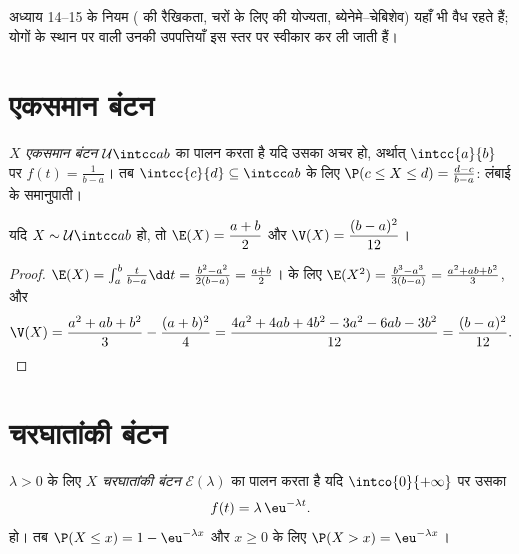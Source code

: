 अध्याय 14--15 के नियम ( की रैखिकता,  चरों के लिए  की
योज्यता, ब्येनेमे--चेबिशेव) यहाँ भी वैध रहते हैं; योगों के स्थान पर 
वाली उनकी उपपत्तियाँ इस स्तर पर स्वीकार कर ली जाती हैं।

\section{एकसमान बंटन}

\begin{definition}[एकसमान बंटन]\label{def:g12:contdist:uniform}
$X$ \emph{एकसमान बंटन} $\mathcal U\intcc ab$ का पालन करता है यदि उसका
 अचर हो, अर्थात् $\intcc{a}{b}$ पर $f(t) = \frac{1}{b-a}$। तब $\intcc{c}{d} \subseteq \intcc ab$ के लिए $\P(c \leq X \leq d) = \frac{d - c}{b - a}$:  लंबाई के
समानुपाती।
\end{definition}

\begin{proposition}\label{prop:g12:contdist:uniformmoments}
यदि $X \sim \mathcal U\intcc ab$ हो, तो $\E(X) = \dfrac{a+b}{2}$ और $\V(X) = \dfrac{(b-a)^2}{12}$।
\end{proposition}

\begin{proof}
$\E(X) = \int_a^b \frac{t}{b-a}\dd t
= \frac{b^2 - a^2}{2(b-a)} = \frac{a+b}{2}$।  के लिए $\E(X^2) = \frac{b^3 - a^3}{3(b-a)} = \frac{a^2 + ab + b^2}{3}$, और
\[
\V(X) = \frac{a^2 + ab + b^2}{3} - \frac{(a+b)^2}{4}
= \frac{4a^2 + 4ab + 4b^2 - 3a^2 - 6ab - 3b^2}{12}
= \frac{(b - a)^2}{12}. \qedhere
\]
\end{proof}

\section{चरघातांकी बंटन}

\begin{definition}[चरघातांकी बंटन]\label{def:g12:contdist:expo}
$\lambda > 0$ के लिए $X$ \emph{चरघातांकी बंटन} $\mathcal E(\lambda)$ का पालन
करता है यदि $\intco{0}{+\infty}$ पर उसका 
\[
f(t) = \lambda\,\eu^{-\lambda t}.
\]
हो। तब $\P(X \leq x) = 1 - \eu^{-\lambda x}$ और $x \geq 0$ के लिए $\P(X > x) = \eu^{-\lambda x}$।
\end{definition}

